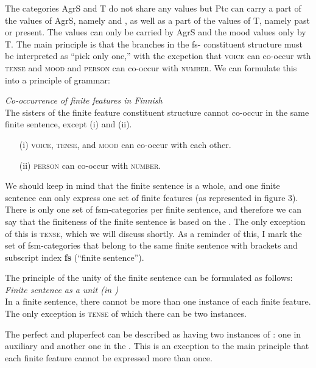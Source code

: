 \documentclass[output=paper]{langsci/langscibook}
\begin{document}
The categories AgrS and T do not share any values but Ptc can carry a part of the values of AgrS, namely  and , as well as a part of the values of T, namely past or present. The  values can only be carried by AgrS and the mood values only by T. The main principle is that the branches in the fs- constituent structure must be interpreted as “pick only one,” with the excpetion that \textsc{voice} can co-occur wth \textsc{tense} and \textsc{mood} and \textsc{person} can co-occur with \textsc{number}. We can formulate this into a principle of  grammar:

\ea
\textit{{Co-occurrence of finite features in Finnish}}\\
The sisters of the finite feature constituent structure cannot co-occur in the same finite sentence, except (i) and (ii).
\begin{enumerate}
 \item[(i)] \textsc{voice}, \textsc{tense}, and \textsc{mood} can co-occur with each other.
 \item[(ii)] \textsc{person} can co-occur with \textsc{number}.
\end{enumerate}
\z

We should keep in mind that the finite sentence is a whole, and one finite sentence can only express one set of finite features (as represented in figure 3).   There is only one set of fsm-categories per finite sentence, and therefore we can say that the finiteness of the finite sentence is based on the . The only exception of this is \textsc{tense}, which we will discuss shortly. As a reminder of this, I mark the set of fsm-categories that belong to the same finite sentence with brackets and subscript index \textbf{fs} (“finite sentence”).

The principle of the unity of the finite sentence can be formulated as follows:
\ea
\textit{{Finite sentence as a unit (in )}}\\
In a finite sentence, there cannot be more than one instance of each finite feature. The only exception is \textsc{tense} of which there can be two instances.
\z

The perfect and pluperfect  can be described as having two instances of : one in auxiliary and another one in the . This is an exception to the main principle that each finite feature cannot be expressed more than once.
\end{document}
